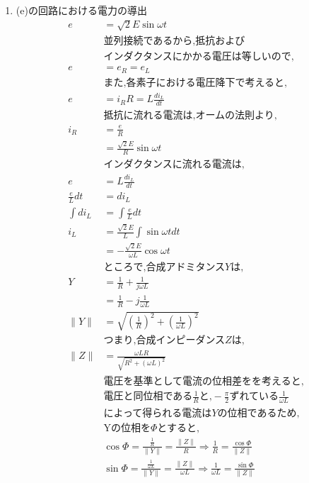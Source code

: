 \documentclass[twocolumn]{article}
\begin{document}
\begin{enumerate}
    \item (e)の回路における電力の導出
    \begin{align*}
      e   &=\sqrt{2}E\sin\omega t\\
      &\text{並列接続であるから,抵抗および}\\
      &\text{インダクタンスにかかる電圧は等しいので,}\\
      e   &= e_R = e_L\\
      &\text{また,各素子における電圧降下で考えると,}\\
      e   &= {i_R}R = L\frac{di_L}{dt}\\
      &\text{抵抗に流れる電流は,オームの法則より,}\\
      i_R &= \frac{e}{R}\\
          &= \frac{\sqrt{2}E}{R}\sin \omega t\\
      &\text{インダクタンスに流れる電流は,}\\
      e   &= L\frac{di_L}{dt}\\
      \frac{e}{L}dt &= di_L\\
      \int di_L &= \int \frac{e}{L}dt\\
      i_L &= \frac{\sqrt{2}E}{L} \int \sin \omega t dt\\
          &= -\frac{\sqrt{2}E}{\omega L} \cos \omega t\\
      &\text{ところで,合成アドミタンス}Y\text{は,}\\
      Y   &= \frac{1}{R} + \frac{1}{j\omega L}\\
          &= \frac{1}{R} - j\frac{1}{\omega L}\\
      \|Y\| &= \sqrt{{\left(\frac{1}{R}\right)}^2 + {\left(\frac{1}{\omega L}\right)}^2}\\
      &\text{つまり,合成インピーダンス}Z\text{は,}\\
      \|Z\| &= \frac{\omega LR}{\sqrt{R^2 + {\left(\omega L\right)}^2}}\\
      &\text{電圧を基準として電流の位相差をを考えると,}\\
      &\text{電圧と同位相である}\frac{1}{R}\text{と,}-\frac{\pi}{2}\text{ずれている}\frac{1}{\omega L}\\
      &\text{によって得られる電流は}Y\text{の位相であるため,}\\
      &\text{Yの位相を}\Phi\text{とすると,}\\
      &\cos \Phi = \frac{\frac{1}{R}}{\|Y\|} = \frac{\|Z\|}{R} \Rightarrow  \frac{1}{R} = \frac{\cos \Phi}{\|Z\|}\\
      &\sin \Phi = \frac{\frac{1}{\omega L}}{\|Y\|} = \frac{\|Z\|}{\omega L} \Rightarrow  \frac{1}{\omega L} = \frac{\sin \Phi}{\|Z\|}\\

\end{align*}
\end{enumerate}
\end{document}
